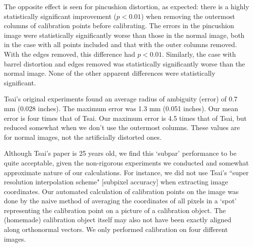 The opposite effect is seen for pincushion distortion, as expected: there is a highly statistically significant improvement ($p < 0.01$) when removing the outermost columns of calibration points before calibrating. The errors in the pincushion image were statistically significantly worse than those in the normal image, both in the case with all points included and that with the outer columns removed. With the edges removed, this difference had $p < 0.01$. Similarly, the case with barrel distortion and edges removed was statistically significantly worse than the normal image. None of the other apparent differences were statistically significant.

Tsai's original experiments found an average radius of ambiguity (error) of 0.7 mm (0.028 inches). The maximum error was 1.3 mm (0.051 inches). Our mean error is four times that of Tsai. \cite{TSAI} Our maximum error is 4.5 times that of Tsai, but reduced somewhat when we don't use the outermost columns. These values are for normal images, not the artificially distorted ones.

Although Tsai's paper is 25 years old, we find this `subpar' performance to be quite acceptable, given the non-rigorous experiments we conducted and somewhat approximate nature of our calculations. For instance, we did not use Tsai's ``super resolution interpolation scheme" [subpixel accuracy] when extracting image coordinates. Our automated calculation of calibration points on the image was done by the naive method of averaging the coordinates of all pixels in a `spot' representing the calibration point on a picture of a calibration object. The (homemade) calibration object itself may also not have been exactly aligned along orthonormal vectors. We only performed calibration on four different images.



